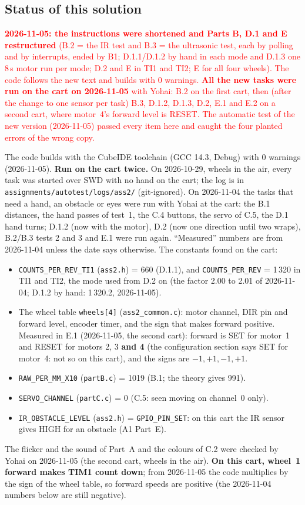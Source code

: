 \documentclass[11pt,a4paper]{article}
\begin{document}
\subsection{Status of this solution}
\textcolor{red}{\textbf{2026-11-05: the instructions were shortened and Parts B, D.1 and E restructured} (B.2 = the IR
test and B.3 = the ultrasonic test, each by polling and by interrupts, ended by B1; D.1.1/D.1.2 by hand in each mode
and D.1.3 one 8\,s motor run per mode; D.2 and E in TI1 and TI2; E for all four wheels). The code follows the new text and builds with 0 warnings. \textbf{All the new tasks were run on the cart on
2026-11-05} with Yohai: B.2 on the first cart, then (after the change to one sensor per task) B.3, D.1.2, D.1.3,
D.2, E.1 and E.2 on a second cart, where motor~4's forward level is RESET. The automatic test of the new version
(2026-11-05) passed every item here and caught the four planted errors of the wrong copy.}

\smallskip\noindent
The code builds with the CubeIDE toolchain (GCC 14.3, Debug) with 0 warnings (2026-11-05). \textbf{Run on the cart
twice.} On 2026-10-29, wheels in the air, every task was started over SWD with no hand on the cart; the log is in
\texttt{assignments/autotest/logs/ass2/} (git-ignored). On 2026-11-04 the tasks that need a hand, an obstacle or
eyes were run with Yohai at the cart: the B.1 distances, the hand passes of test~1, the C.4 buttons, the servo of C.5,
the D.1 hand turns; D.1.2 (now with the motor), D.2 (now one direction until two wraps), B.2/B.3 tests 2 and 3 and
E.1 were run again. ``Measured'' numbers are from 2026-11-04 unless the date says otherwise. The constants found on
the cart:
\begin{itemize}
  \item \texttt{COUNTS\_PER\_REV\_TI1} (\texttt{ass2.h}) = 660 (D.1.1), and \texttt{COUNTS\_PER\_REV} = 1\,320 in TI1
        and TI2, the mode used from D.2 on (the factor 2.00 to 2.01 of 2026-11-04; D.1.2 by hand: 1\,320.2, 2026-11-05).
  \item The wheel table \texttt{wheels[4]} (\texttt{ass2\_common.c}): motor channel, DIR pin and forward level, encoder
        timer, and the sign that makes forward positive. Measured in E.1 (2026-11-05, the second cart): forward is
        SET for motor~1 and RESET for motors 2, 3 \textbf{and 4} (the configuration section says SET for motor~4:
        not so on this cart), and the signs are $-1, +1, -1, +1$.
  \item \texttt{RAW\_PER\_MM\_X10} (\texttt{partB.c}) = 1019 (B.1; the theory gives 991).
  \item \texttt{SERVO\_CHANNEL} (\texttt{partC.c}) = 0 (C.5: seen moving on channel~0 only).
  \item \texttt{IR\_OBSTACLE\_LEVEL} (\texttt{ass2.h}) = \texttt{GPIO\_PIN\_SET}: on this cart the IR sensor gives HIGH
        for an obstacle (A1 Part~E).
\end{itemize}
The flicker and the sound of Part~A and the colours of C.2 were checked by Yohai on 2026-11-05 (the second cart, wheels in the air).
\textbf{On this cart, wheel~1 forward makes TIM1 count down}; from 2026-11-05 the code multiplies by the sign of the
wheel table, so forward speeds are positive (the 2026-11-04 numbers below are still negative).
\end{document}
